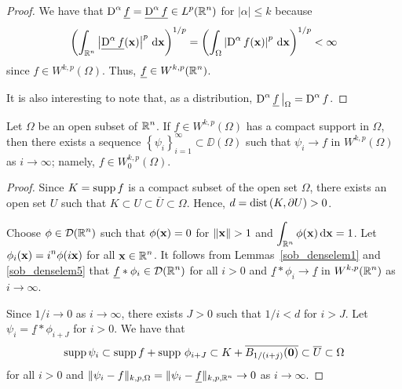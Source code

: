 \begin{proof}
 We have that $\displaystyle \operatorname{D}^\alpha \underline{f}
= \underline{\operatorname{D}^\alpha f} \in L^p(\mathbb{R}^n)$ for $|\alpha| \leq k$ because
\[
\left( \int_{\mathbb{R}^n} \left|\underline{\operatorname{D}^\alpha f}(\mathbf{x})\right|^p
\,\mathrm{d}{\mathbf{x}}\right)^{1/p} = 
\left( \int_{\Omega} \left| \operatorname{D}^\alpha f(\mathbf{x}) \right|^p
\,\mathrm{d}{\mathbf{x}}\right)^{1/p} < \infty
\]
since $\displaystyle f \in W^{k,p}(\Omega)$.  Thus,
$\displaystyle \underline{f} \in W^{k,p}(\mathbb{R}^n)$.

It is also interesting to note that, as a distribution,
$\displaystyle \operatorname{D}^\alpha \underline{f}\,\big|_{\Omega} = \operatorname{D}^\alpha f$.
\end{proof}

\begin{lemma} \label{sob_w0_trad1}
Let $\Omega$ be an open subset of $\displaystyle \mathbb{R}^n$.
If $\displaystyle f \in W^{k,p}(\Omega)$ has a compact support in
$\Omega$, then there exists a sequence
$\displaystyle \left\{ \psi_i \right\}_{i=1}^\infty \subset \DD(\Omega)$
such that $\psi_i \to f$ in $\displaystyle W^{k,p}(\Omega)$ as
$i \to \infty$; namely, $\displaystyle f\in W^{k,p}_0(\Omega)$.
\end{lemma}

\begin{proof}
Since $K = \operatorname{supp} f$ is a compact subset of the open set $\Omega$,
there exists an open set $U$ such that
$K \subset U \subset \overline{U} \subset \Omega$.  Hence,
$\displaystyle d = \mathrm{dist}\left(K,\partial U\right) > 0$. 

Choose $\displaystyle \phi \in \mathcal{D}(\mathbb{R}^n)$ such that
$\phi(\mathbf{x}) = 0$ for $\|\VEC{x}\|>1$ and
$\displaystyle \int_{\mathbb{R}^n} \phi(\mathbf{x}) \,\mathrm{d}{\mathbf{x}} = 1$.
Let $\displaystyle \phi_i(\mathbf{x}) = i^n\phi(i \mathbf{x})$ for all
$\displaystyle \mathbf{x} \in \mathbb{R}^n$.
It follows from Lemmas~\ref{sob_denselem1} and
\ref{sob_denselem5} that 
$\displaystyle \underline{f} \ast \phi_i \in \mathcal{D}(\mathbb{R}^n)$ for all $i>0$
and
$\underline{f} \ast \phi_i \to \underline{f}$ in
$\displaystyle W^{k,p}(\mathbb{R}^n)$ as $i \to \infty$.

Since $1/i \to 0$ as $i\to \infty$, there exists $J>0$ such that $1/i<d$
for $i > J$.  Let $\psi_i = \underline{f} \ast \phi_{i+J}$ for $i>0$.
We have that
\[
  \operatorname{supp} \psi_i \subset \operatorname{supp} f + \operatorname{supp}\, \phi_{i+J}
  \subset K + \overline{B_{1/(i+j)}(\mathbf{0})}
  \subset \overline{U} \subset \Omega
\]
for all $i >0$ and
$\displaystyle \| \psi_i - f \|_{k,p,\Omega}
= \| \psi_i - \underline{f} \|_{k,p,\mathbb{R}^n} \to 0$
as $i \to \infty$.
\end{proof}

